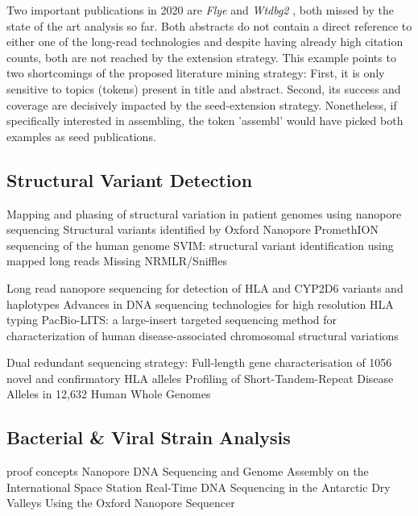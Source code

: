 Two important publications in 2020 are \textit{Flye} \cite{Kolmogorov2019} and \textit{Wtdbg2} \cite{Ruan2020}, both missed by the state of the art analysis so far.
Both abstracts do not contain a direct reference to either one of the long-read technologies and despite having already high citation counts, both are not reached by the extension strategy.
This example points to two shortcomings of the proposed literature mining strategy: First, it is only sensitive to topics (tokens) present in title and abstract.
Second, its success and coverage are decisively impacted by the seed-extension strategy.
Nonetheless, if specifically interested in assembling, the token 'assembl' would have picked both examples as seed publications.




\subsection{Structural Variant Detection}
\label{subsec:state_of_art:sv}

Mapping and phasing of structural variation in patient genomes using nanopore sequencing \cite{Stancu2017}
Structural variants identified by Oxford Nanopore PromethION sequencing of the human genome \cite{Coster2019}
SVIM: structural variant identification using mapped long reads \cite{Heller2019}
Missing NRMLR/Sniffles \cite{Sedlazeck2018}

Long read nanopore sequencing for detection of HLA and CYP2D6 variants and haplotypes \cite{Ammar2015}
Advances in DNA sequencing technologies for high resolution HLA typing \cite{Cereb2015}
PacBio-LITS: a large-insert targeted sequencing method for characterization of human disease-associated chromosomal structural variations \cite{Wang2015}

Dual redundant sequencing strategy: Full-length gene characterisation of 1056 novel and confirmatory HLA alleles \cite{Albrecht2017}
Profiling of Short-Tandem-Repeat Disease Alleles in 12,632 Human Whole Genomes \cite{Tang2017}




\subsection{Bacterial \& Viral Strain Analysis}
\label{subsec:state_of_art:strain}

proof concepts
Nanopore DNA Sequencing and Genome Assembly on the International Space Station \cite{Castro-Wallace2017}
Real-Time DNA Sequencing in the Antarctic Dry Valleys Using the Oxford Nanopore Sequencer \cite{Johnson2017}

